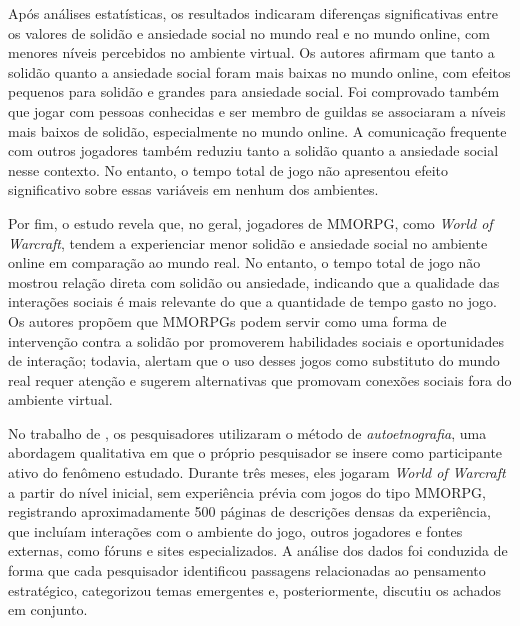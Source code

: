 Após análises estatísticas, os resultados indicaram diferenças significativas entre os valores de solidão e ansiedade social no mundo real e no mundo online, com menores níveis percebidos no ambiente virtual.
Os autores afirmam que tanto a solidão quanto a ansiedade social foram mais baixas no mundo online, com efeitos pequenos para solidão e grandes para ansiedade social.
Foi comprovado também que jogar com pessoas conhecidas e ser membro de guildas se associaram a níveis mais baixos de solidão, especialmente no mundo online.
A comunicação frequente com outros jogadores também reduziu tanto a solidão quanto a ansiedade social nesse contexto.
No entanto, o tempo total de jogo não apresentou efeito significativo sobre essas variáveis em nenhum dos ambientes.

Por fim, o estudo revela que, no geral, jogadores de MMORPG, como \textit{World of Warcraft}, tendem a experienciar menor solidão e ansiedade social no ambiente online em comparação ao mundo real. No entanto, o tempo total de jogo não mostrou relação direta com solidão ou ansiedade, indicando que a qualidade das interações sociais é mais relevante do que a quantidade de tempo gasto no jogo. Os autores propõem que MMORPGs podem servir como uma forma de intervenção contra a solidão por promoverem habilidades sociais e oportunidades de interação; todavia, alertam que o uso desses jogos como substituto do mundo real requer atenção e sugerem alternativas que promovam conexões sociais fora do ambiente virtual.

No trabalho de , os pesquisadores utilizaram o método de \textit{autoetnografia}, uma abordagem qualitativa em que o próprio pesquisador se insere como participante ativo do fenômeno estudado.
Durante três meses, eles jogaram \textit{World of Warcraft} a partir do nível inicial, sem experiência prévia com jogos do tipo MMORPG, registrando aproximadamente 500 páginas de descrições densas da experiência, que incluíam interações com o ambiente do jogo, outros jogadores e fontes externas, como fóruns e sites especializados.
A análise dos dados foi conduzida de forma que cada pesquisador identificou passagens relacionadas ao pensamento estratégico, categorizou temas emergentes e, posteriormente, discutiu os achados em conjunto.

